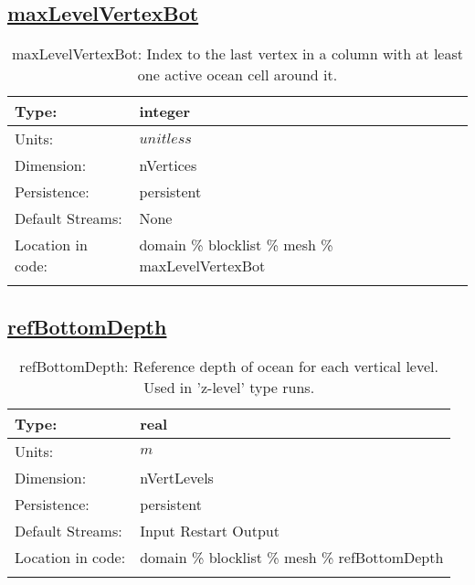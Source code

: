 \subsection[maxLevelVertexBot]{\hyperref[sec:var_tab_mesh]{maxLevelVertexBot}}
\label{subsec:var_sec_mesh_maxLevelVertexBot}
\begin{center}
\begin{longtable}{| p{2.0in} | p{4.0in} |}
        \hline 
        Type: & integer \\
        \hline 
        Units: & $unitless$ \\
        \hline 
        Dimension: & nVertices \\
        \hline 
        Persistence: & persistent \\
        \hline 
		 Default Streams: & None \\
        \hline 
		 Location in code: & domain \% blocklist \% mesh \% maxLevelVertexBot \\
		 \hline 
    \caption{maxLevelVertexBot: Index to the last vertex in a column with at least one active ocean cell around it.}
\end{longtable}
\end{center}
\subsection[refBottomDepth]{\hyperref[sec:var_tab_mesh]{refBottomDepth}}
\label{subsec:var_sec_mesh_refBottomDepth}
\begin{center}
\begin{longtable}{| p{2.0in} | p{4.0in} |}
        \hline 
        Type: & real \\
        \hline 
        Units: & $m$ \\
        \hline 
        Dimension: & nVertLevels \\
        \hline 
        Persistence: & persistent \\
        \hline 
		 Default Streams: & Input Restart Output  \\
        \hline 
		 Location in code: & domain \% blocklist \% mesh \% refBottomDepth \\
		 \hline 
    \caption{refBottomDepth: Reference depth of ocean for each vertical level. Used in 'z-level' type runs.}
\end{longtable}
\end{center}
